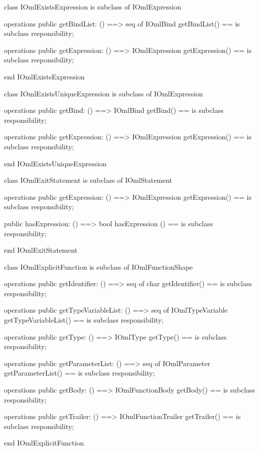 \begin{vdm_al}
class IOmlExistsExpression
 is subclass of IOmlExpression

operations
  public getBindList: () ==> seq of IOmlBind
  getBindList() == is subclass responsibility;

operations
  public getExpression: () ==> IOmlExpression
  getExpression() == is subclass responsibility;

end IOmlExistsExpression
\end{vdm_al}

\begin{vdm_al}
class IOmlExistsUniqueExpression
 is subclass of IOmlExpression

operations
  public getBind: () ==> IOmlBind
  getBind() == is subclass responsibility;

operations
  public getExpression: () ==> IOmlExpression
  getExpression() == is subclass responsibility;

end IOmlExistsUniqueExpression
\end{vdm_al}

\begin{vdm_al}
class IOmlExitStatement
 is subclass of IOmlStatement

operations
  public getExpression: () ==> IOmlExpression
  getExpression() == is subclass responsibility;

  public hasExpression: () ==> bool
  hasExpression () == is subclass responsibility;

end IOmlExitStatement
\end{vdm_al}

\begin{vdm_al}
class IOmlExplicitFunction
 is subclass of IOmlFunctionShape

operations
  public getIdentifier: () ==> seq of char
  getIdentifier() == is subclass responsibility;

operations
  public getTypeVariableList: () ==> seq of IOmlTypeVariable
  getTypeVariableList() == is subclass responsibility;

operations
  public getType: () ==> IOmlType
  getType() == is subclass responsibility;

operations
  public getParameterList: () ==> seq of IOmlParameter
  getParameterList() == is subclass responsibility;

operations
  public getBody: () ==> IOmlFunctionBody
  getBody() == is subclass responsibility;

operations
  public getTrailer: () ==> IOmlFunctionTrailer
  getTrailer() == is subclass responsibility;

end IOmlExplicitFunction
\end{vdm_al}

